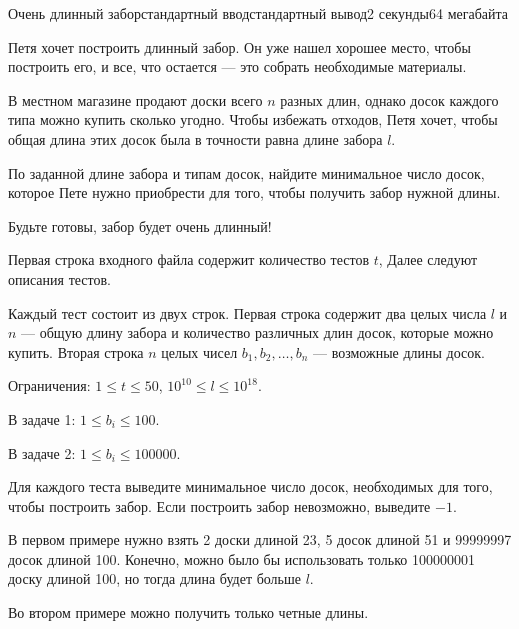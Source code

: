 \begin{problem}{Очень длинный забор}{стандартный ввод}{стандартный вывод}{2 секунды}{64 мегабайта}

Петя хочет построить длинный забор. Он уже нашел хорошее место, чтобы построить его, и все, что остается --- это собрать необходимые материалы.

В местном магазине продают доски всего $n$ разных длин, однако досок каждого типа можно купить сколько угодно. Чтобы избежать отходов, Петя хочет, чтобы общая длина этих досок была в точности равна длине забора $l$.

По заданной длине забора и типам досок, найдите минимальное число досок, которое Пете нужно приобрести для того, чтобы получить забор нужной длины.

Будьте готовы, забор будет очень длинный!


\InputFile
Первая строка входного файла содержит количество тестов $t$, Далее следуют описания тестов.

Каждый тест состоит из двух строк. Первая строка содержит два целых числа $l$ и $n$ --- общую длину забора и количество различных длин досок, которые можно купить. Вторая строка $n$ целых чисел $b_1, b_2, \ldots, b_n$ --- возможные длины досок.

Ограничения: $1\le t\le 50$, $10^{10}\le l\le 10^{18}$.

В задаче 1: $1\le b_i\le 100$.

В задаче 2: $1\le b_i\le 100000$.


\OutputFile
Для каждого теста выведите минимальное число досок, необходимых для того, чтобы построить забор. Если построить забор невозможно, выведите $-1$.

\Examples

\begin{example}
%
\end{example}

\Note
В первом примере нужно взять 2 доски длиной 23, 5 досок длиной 51 и 99999997 досок длиной 100. Конечно, можно было бы использовать только 100000001 доску длиной 100, но тогда длина будет больше $l$.

Во втором примере можно получить только четные длины.

\end{problem}
